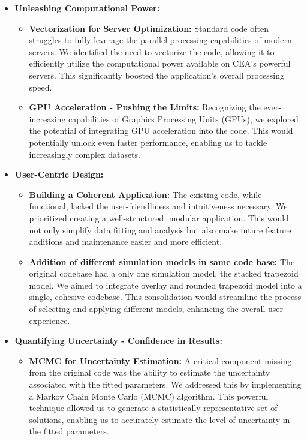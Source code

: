 \begin{itemize}
    \item \textbf{Unleashing Computational Power:}
    \begin{itemize}
        \item \textbf{Vectorization for Server Optimization:} Standard code often struggles to fully leverage the parallel processing capabilities of modern servers. We identified the need to vectorize the code, allowing it to efficiently utilize the computational power available on CEA's powerful servers. This significantly boosted the application's overall processing speed.
        \item \textbf{GPU Acceleration - Pushing the Limits:} Recognizing the ever-increasing capabilities of Graphics Processing Units (GPUs), we explored the potential of integrating GPU acceleration into the code. This would potentially unlock even faster performance, enabling us to tackle increasingly complex datasets.
    \end{itemize}
    \item \textbf{User-Centric Design:}
    \begin{itemize}
        \item \textbf{Building a Coherent Application:} The existing code, while functional, lacked the user-friendliness and intuitiveness necessary. We prioritized creating a well-structured, modular application. This would not only simplify data fitting and analysis but also make future feature additions and maintenance easier and more efficient.
        \item \textbf{Addition of different simulation models in same code base:} The original codebase had a only one simulation model, the stacked trapezoid model. We aimed to integrate overlay and rounded trapezoid model into a single, cohesive codebase. This consolidation would streamline the process of selecting and applying different models, enhancing the overall user experience.
      \end{itemize}
    \item \textbf{Quantifying Uncertainty - Confidence in Results:}
    \begin{itemize}
        \item \textbf{MCMC for Uncertainty Estimation:} A critical component missing from the original code was the ability to estimate the uncertainty associated with the fitted parameters. We addressed this by implementing a Markov Chain Monte Carlo (MCMC) algorithm. This powerful technique allowed us to generate a statistically representative set of solutions, enabling us to accurately estimate the level of uncertainty in the fitted parameters.

\end{itemize}
\end{itemize}
